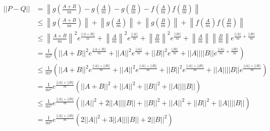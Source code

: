 \documentclass[a4paper, 10pt, dvipdfmx]{jlreq}
\begin{document}
\begin{align*}
    ||P-Q|| & = \left\lVert g\left(\frac{A+B}{m}\right)-g\left(\frac{A}{m}\right)-g\left(\frac{B}{m}\right)-f\left(\frac{A}{m}\right)f\left(\frac{B}{m}\right) \right\rVert                                                                                                                                      \\
            & \leq \left\lVert g\left(\frac{A+B}{m}\right)\right\rVert+\left\lVert g\left(\frac{A}{m}\right)\right\rVert+\left\lVert g\left(\frac{B}{m}\right)\right\rVert+\left\lVert f\left(\frac{A}{m}\right)f\left(\frac{B}{m}\right) \right\rVert                                                           \\
            & \leq \left\lVert \frac{A+B}{m}\right\rVert^2 e^{\frac{||A+B||}{m}}+\left\lVert \frac{A}{m}\right\rVert^2 e^{\frac{||A||}{m}}+\left\lVert \frac{B}{m}\right\rVert^2 e^{\frac{||B||}{m}}+\left\lVert \frac{A}{m}\right\rVert\left\lVert \frac{B}{m} \right\rVert e^{\frac{||A||}{m}+\frac{||B||}{m}} \\
            & = \frac{1}{m^2} \left(||A+B||^2 e^{\frac{||A+B||}{m}}+ ||A||^2 e^{\frac{||A||}{m}}+ ||B||^2 e^{\frac{||B||}{m}}+ ||A|| ||B|| e^{\frac{||A||}{m}+\frac{||B||}{m}}\right)                                                                                                                            \\
            & \leq \frac{1}{m^2} \left(||A+B||^2 e^{\frac{||A||+||B||}{m}}+ ||A||^2 e^{\frac{||A||+||B||}{m}}+ ||B||^2 e^{\frac{||A||+||B||}{m}}+ ||A|| ||B|| e^{\frac{||A||+||B||}{m}}\right)                                                                                                                   \\
            & = \frac{1}{m^2}e^{\frac{||A||+||B||}{m}} \left(||A+B||^2 + ||A||^2 + ||B||^2 + ||A|| ||B|| \right)                                                                                                                                                                                                 \\
            & \leq \frac{1}{m^2}e^{\frac{||A||+||B||}{m}} \left(||A||^2+2||A||||B||+||B||^2 + ||A||^2 + ||B||^2 + ||A||||B|| \right)                                                                                                                                                                             \\
            & = \frac{1}{m^2}e^{\frac{||A||+||B||}{m}} \left(2||A||^2+3||A||||B||+2||B||^2 \right)                                                                                                                                                                                                               \\

\end{align*}
\end{document}
